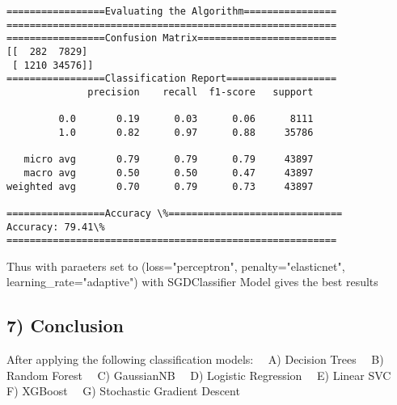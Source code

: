 \documentclass[11pt]{article}
\begin{document}
    \begin{Verbatim}[commandchars=\\\{\}]
=================Evaluating the Algorithm================
=========================================================
=================Confusion Matrix========================
[[  282  7829]
 [ 1210 34576]]
=================Classification Report===================
              precision    recall  f1-score   support

         0.0       0.19      0.03      0.06      8111
         1.0       0.82      0.97      0.88     35786

   micro avg       0.79      0.79      0.79     43897
   macro avg       0.50      0.50      0.47     43897
weighted avg       0.70      0.79      0.73     43897

=================Accuracy \%==============================
Accuracy: 79.41\%
=========================================================

    \end{Verbatim}

    Thus with paraeters set to (loss="perceptron", penalty="elasticnet",
learning\_rate="adaptive") with SGDClassifier Model gives the best
results

    \subsection{7) Conclusion}\label{conclusion}

After applying the following classification models:  A) Decision Trees
 B) Random Forest  C) GaussianNB  D) Logistic Regression  E) Linear SVC
 F) XGBoost  G) Stochastic Gradient Descent
\end{document}
